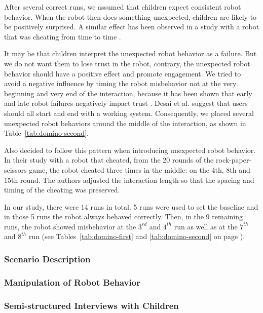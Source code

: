 \documentclass{sig-alternate}
\begin{document}
After several correct runs, we assumed that children expect consistent robot
behavior. When the robot then does something unexpected, children are likely to
be positively surprised. A similar effect has been observed in a study with a
robot that was cheating from time to time \cite{short_no_2010}.

It may be that children interpret the unexpected robot behavior as a failure.
But we do not want them to lose trust in the robot, contrary, the unexpected
robot behavior should have a positive effect and promote engagement. We tried to
avoid a negative influence by timing the robot misbehavior not at the very
beginning and very end of the interaction, because it has been shown that early
and late robot failures negatively impact trust
\cite{desai_effects_2012,desai_impact_2013}. Desai et al. suggest that users
should all start and end with a working system. Consequently, we placed several
unexpected robot behaviors around the middle of the interaction, as shown in
Table~\ref{tab:domino-second}.

Also \cite{short_no_2010} decided to follow this pattern when introducing
unexpected robot behavior. In their study with a robot that cheated, from the 20
rounds of the rock-paper-scissors game, the robot cheated three times in the
middle: on the 4th, 8th and 15th round. The authors adjusted the interaction
length so that the spacing and timing of the cheating was preserved.

In our study, there were 14 runs in total. 5 runs were used to set the baseline
and in those 5 runs the robot always behaved correctly. Then, in the 9 remaining
runs, the robot showed misbehavior at the $3^{rd}$ and $4^{th}$ run as well as
at the $7^{th}$ and $8^{th}$ run (see Tables~\ref{tab:domino-first} and
\ref{tab:domino-second} on page \pageref{tab:domino-first}).	

\subsubsection{Scenario Description}

\subsubsection{Manipulation of Robot Behavior}

\subsubsection{Semi-structured Interviews with Children}
\end{document}

